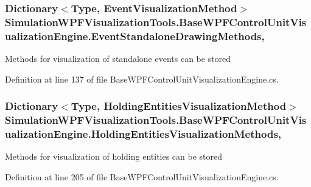 \subsubsection[{\texorpdfstring{Event\+Standalone\+Drawing\+Methods}{EventStandaloneDrawingMethods}}]{\setlength{\rightskip}{0pt plus 5cm}Dictionary$<$Type, {\bf Event\+Visualization\+Method}$>$ Simulation\+W\+P\+F\+Visualization\+Tools.\+Base\+W\+P\+F\+Control\+Unit\+Visualization\+Engine.\+Event\+Standalone\+Drawing\+Methods\hspace{0.3cm}{\ttfamily [get]}, {\ttfamily [protected]}}\hypertarget{class_simulation_w_p_f_visualization_tools_1_1_base_w_p_f_control_unit_visualization_engine_a728acf30d91644e8fb9ae972b30dfe82}{}\label{class_simulation_w_p_f_visualization_tools_1_1_base_w_p_f_control_unit_visualization_engine_a728acf30d91644e8fb9ae972b30dfe82}


Methods for visualization of standalone events can be stored 



Definition at line 137 of file Base\+W\+P\+F\+Control\+Unit\+Visualization\+Engine.\+cs.

\subsubsection[{\texorpdfstring{Holding\+Entities\+Visualization\+Methods}{HoldingEntitiesVisualizationMethods}}]{\setlength{\rightskip}{0pt plus 5cm}Dictionary$<$Type, {\bf Holding\+Entities\+Visualization\+Method}$>$ Simulation\+W\+P\+F\+Visualization\+Tools.\+Base\+W\+P\+F\+Control\+Unit\+Visualization\+Engine.\+Holding\+Entities\+Visualization\+Methods\hspace{0.3cm}{\ttfamily [get]}, {\ttfamily [protected]}}\hypertarget{class_simulation_w_p_f_visualization_tools_1_1_base_w_p_f_control_unit_visualization_engine_a247673914ce8f3f88f5f578ab76390bd}{}\label{class_simulation_w_p_f_visualization_tools_1_1_base_w_p_f_control_unit_visualization_engine_a247673914ce8f3f88f5f578ab76390bd}


Methods for visualization of holding entities can be stored 



Definition at line 205 of file Base\+W\+P\+F\+Control\+Unit\+Visualization\+Engine.\+cs.

